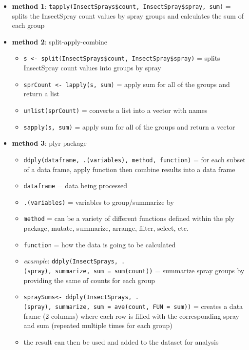 \documentclass[
]{article}
\providecommand{\tightlist}{%
  \setlength{\itemsep}{0pt}\setlength{\parskip}{0pt}}
\begin{document}
\begin{itemize}
  \begin{itemize}
  \tightlist
  \item
    \textbf{method 1}:
    \texttt{tapply(InsectSprays\$count,\ InsectSpray\$spray,\ sum)} =
    splits the InsectSpray count values by spray groups and calculates
    the sum of each group
  \item
    \textbf{method 2}: split-apply-combine

    \begin{itemize}
    \tightlist
    \item
      \texttt{s\ \textless{}-\ split(InsectSprays\$count,\ InsectSpray\$spray)}
      = splits InsectSpray count values into groups by spray
    \item
      \texttt{sprCount\ \textless{}-\ lapply(s,\ sum)} = apply sum for
      all of the groups and return a list
    \item
      \texttt{unlist(sprCount)} = converts a list into a vector with
      names
    \item
      \texttt{sapply(s,\ sum)} = apply sum for all of the groups and
      return a vector
    \end{itemize}
  \item
    \textbf{method 3}: plyr package

    \begin{itemize}
    \tightlist
    \item
      \texttt{ddply(dataframe,\ .(variables),\ method,\ function)} = for
      each subset of a data frame, apply function then combine results
      into a data frame
    \item
      \texttt{dataframe} = data being processed
    \item
      \texttt{.(variables)} = variables to group/summarize by
    \item
      \texttt{method} = can be a variety of different functions defined
      within the ply package, mutate, summarize, arrange, filter,
      select, etc.
    \item
      \texttt{function} = how the data is going to be calculated
    \item
      \emph{example}:
      \texttt{ddply(InsectSprays,\ .(spray),\ summarize,\ sum\ =\ sum(count))}
      = summarize spray groups by providing the same of counts for each
      group
    \item
      \texttt{spraySums\textless{}-\ ddply(InsectSprays,\ .(spray),\ summarize,\ sum\ =\ ave(count,\ FUN\ =\ sum))}
      = creates a data frame (2 columns) where each row is filled with
      the corresponding spray and sum (repeated multiple times for each
      group)
    \item
      the result can then be used and added to the dataset for analysis
    \end{itemize}
  \end{itemize}
\end{itemize}
\end{document}
